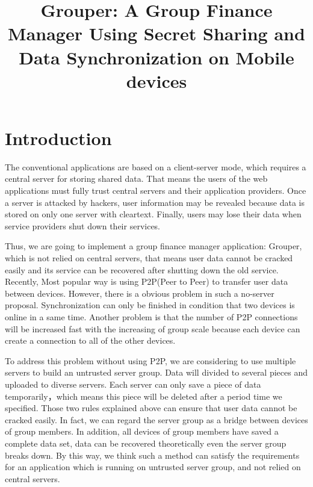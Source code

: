 \documentclass[twocolumn,10pt]{article}
\begin{document}
\date{}

\title{\bf Grouper: A Group Finance Manager Using Secret Sharing and Data Synchronization on Mobile devices}


\maketitle

\section{Introduction}
The conventional applications are based on a client-server mode, which requires a central server for storing shared data. That means the users of the web applications must fully trust central servers and their application providers. Once a server is attacked by hackers, user information may be revealed because data is stored on only one server with cleartext. Finally, users may lose their data when service providers shut down their services.

Thus, we are going to implement a group finance manager application: Grouper, which is not relied on central servers, that means user data cannot be cracked easily and its service can be recovered after shutting down the old service. Recently, Most popular way is using P2P(Peer to Peer) to transfer user data between devices. However, there is a obvious problem in such a no-server proposal. Synchronization can only be finished in condition that two devices is online in a same time. Another problem is that the number of P2P connections will be increased fast with the increasing of group scale because each device can create a connection to all of the other devices. 

To address this problem without using P2P, we are considering to use multiple servers to build an untrusted server group. Data will divided to several pieces and uploaded to diverse servers. Each server can only save a piece of data temporarily，which means this piece will be deleted after a period time we specified. Those two rules explained above can ensure that user data cannot be cracked easily. In fact, we can regard the server group as a bridge between devices of group members. In addition, all devices of group members have saved a complete data set, data can be recovered theoretically even the server group breaks down. By this way, we think such a method can satisfy the requirements for an application which is running on untrusted server group, and not relied on central servers.
\end{document}
